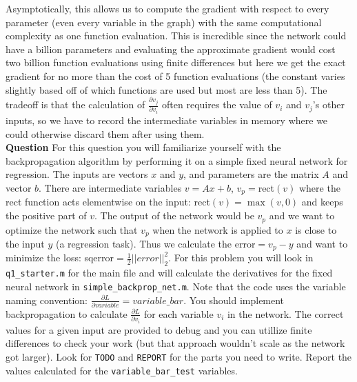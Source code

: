 \documentclass{article}
\begin{document}
Asymptotically, this allows us to compute the gradient with respect to every parameter (even every variable in the graph) with the same computational complexity as one function evaluation.
This is incredible since the network could have a billion parameters and evaluating the approximate gradient would cost two billion function evaluations using finite differences but here we 
get the exact gradient for no more than the cost of 5 function evaluations (the constant varies slightly based off of which functions are used but most are less than 5).
The tradeoff is that the calculation of $\frac{\partial v_j}{\partial v_i}$ often requires the value of $v_i$ and $v_j$'s other inputs, so we have to record the intermediate variables in memory
where we could otherwise discard them after using them.
\\

{\bf Question} For this question you will familiarize yourself with the backpropagation algorithm by performing it on a simple fixed neural network for regression.
The inputs are vectors $x$ and $y$, and parameters are the matrix $A$ and vector $b$.
There are intermediate variables $v = A x + b$, $v_p = $rect$(v)$ where the rect function acts elementwise on the input: rect$(v) = \max(v, 0)$ and keeps the positive part of $v$.
The output of the network would be $v_p$ and we want to optimize the network such that $v_p$ when the network is applied to $x$ is close to the input $y$ (a regression task).
Thus we calculate the error$ = v_p - y$ and want to minimize the loss: sqerror$ = \frac{1}{2}||error||_2^2$.
For this problem you will look in \verb|q1_starter.m| for the main file and will calculate the derivatives for the fixed neural network in \verb|simple_backprop_net.m|.
Note that the code uses the variable naming convention: $\frac{\partial L}{\partial variable} = variable\_bar$.
You should implement backpropagation to calculate $\frac{\partial L}{\partial v_i}$ for each variable $v_i$ in the network.
The correct values for a given input are provided to debug and you can utillize finite differences to check your work (but that approach wouldn't scale as the network got larger).
Look for \verb|TODO| and \verb|REPORT| for the parts you need to write.
Report the values calculated for the \verb|variable_bar_test| variables.
\\



\end{document}

